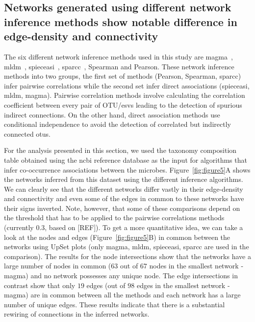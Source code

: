   \FloatBarrier

  \subsection*{Networks generated using different network inference methods show notable difference in edge-density and connectivity}

  The six different network inference methods used in this study are \ac{magma}~\cite{Cougoul2019}, \ac{mldm}~\cite{Yang2017}, \ac{spieceasi}~\cite{Kurtz2015}, \ac{sparcc}~\cite{Friedman2012}, Spearman and Pearson.
  These network inference methods into two groups, the first set of methods (Pearson, Spearman, \ac{sparcc}) infer pairwise correlations while the second set infer direct associations (\ac{spieceasi}, \ac{mldm}, \ac{magma}).
  Pairwise correlation methods involve calculating the correlation coefficient between every pair of \ac{OTU}/\ac{esv}s leading to the detection of spurious indirect connections.
  On the other hand, direct association methods use conditional independence to avoid the detection of correlated but indirectly connected \ac{otu}s.

  For the analysis presented in this section, we used the taxonomy composition table obtained using the \ac{ncbi} reference database as the input for algorithms that infer co-occurrence associations between the microbes.
  Figure~\ref{fig:figure5}A shows the networks inferred from this dataset using the different inference algorithms.
  We can clearly see that the different networks differ vastly in their edge-density and connectivity and even some of the edges in common to these networks have their signs inverted. Note, however, that some of these comparisons depend on the threshold that has to be applied to the pairwise correlations methods (currently 0.3, based on [REF]).
  To get a more quantitative idea, we can take a look at the nodes and edges (Figure~\ref{fig:figure5}B) in common between the networks using UpSet plots (only \ac{magma}, \ac{mldm}, \ac{spieceasi}, \ac{sparcc} are used in the comparison).
  The results for the node intersections show that the networks have a large number of nodes in common ($63$ out of $67$ nodes in the smallest network - \ac{magma}) and no network possesses any unique node.
  The edge intersections in contrast show that only $19$ edges (out of $98$ edges in the smallest network - \ac{magma}) are in common between all the methods and each network has a large number of unique edges.
  These results indicate that there is a substantial rewiring of connections in the inferred networks.

